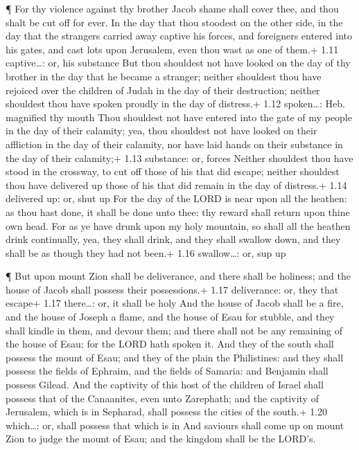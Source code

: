  ¶ For thy violence against thy brother Jacob shame shall
cover thee, and thou shalt be cut off for ever.  In the day
that thou stoodest on the other side, in the day that the strangers
carried away captive his forces, and foreigners entered into his gates,
and cast lots upon Jerusalem, even thou wast as one of them.+ 1.11
captive\ldots: or, his substance  But thou shouldest not
have looked on the day of thy brother in the day that he became a
stranger; neither shouldest thou have rejoiced over the children of
Judah in the day of their destruction; neither shouldest thou have
spoken proudly in the day of distress.+ 1.12 spoken\ldots: Heb.
magnified thy mouth  Thou shouldest not have entered into
the gate of my people in the day of their calamity; yea, thou shouldest
not have looked on their affliction in the day of their calamity, nor
have laid hands on their substance in the day of their calamity;+ 1.13
substance: or, forces  Neither shouldest thou have stood in
the crossway, to cut off those of his that did escape; neither shouldest
thou have delivered up those of his that did remain in the day of
distress.+ 1.14 delivered up: or, shut up  For the day of
the LORD is near upon all the heathen: as thou hast done, it shall be
done unto thee: thy reward shall return upon thine own head.
 For as ye have drunk upon my holy mountain, so shall all
the heathen drink continually, yea, they shall drink, and they shall
swallow down, and they shall be as though they had not been.+ 1.16
swallow\ldots: or, sup up

 ¶ But upon mount Zion shall be deliverance, and there
shall be holiness; and the house of Jacob shall possess their
possessions.+ 1.17 deliverance: or, they that escape+ 1.17 there\ldots:
or, it shall be holy  And the house of Jacob shall be a
fire, and the house of Joseph a flame, and the house of Esau for
stubble, and they shall kindle in them, and devour them; and there shall
not be any remaining of the house of Esau; for the LORD hath spoken it.
 And they of the south shall possess the mount of Esau; and
they of the plain the Philistines: and they shall possess the fields of
Ephraim, and the fields of Samaria: and Benjamin shall possess Gilead.
 And the captivity of this host of the children of Israel
shall possess that of the Canaanites, even unto Zarephath; and the
captivity of Jerusalem, which is in Sepharad, shall possess the cities
of the south.+ 1.20 which\ldots: or, shall possess that which is in
 And saviours shall come up on mount Zion to judge the
mount of Esau; and the kingdom shall be the LORD's.
